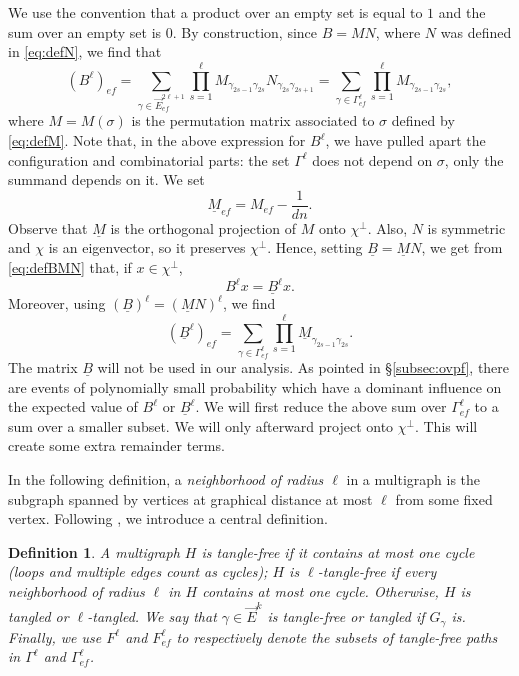 \documentclass[11pt]{article}
\newtheorem{definition}[lemma]{Definition}
\newcommand{\1}{1\!\!{\sf I}}\newcommand{\IND}{\1}
\begin{document}
 We use the convention that a product over an empty set is equal to $1$ and the sum over an empty set is $0$. By construction, since $B = MN$, where $N$ was defined in \eqref{eq:defN}, we find that
$$
(B^{\ell}) _{e f} =  \sum_{\gamma \in \vec E^{2\ell+1} _{e f}} \prod_{s=1}^{\ell} M_{\gamma_{2s-1} \gamma_{2s}} N_{\gamma_{2s} \gamma_{2s +1} } = \sum_{\gamma \in \Gamma^{\ell} _{e f}} \prod_{s=1}^{\ell} M_{\gamma_{2s-1} \gamma_{2s}},
$$
where $M =M(\sigma)$ is the permutation matrix associated to $\sigma$  defined by \eqref{eq:defM}.  Note that, in the above expression for $B^\ell$, we have pulled apart the configuration and combinatorial parts: the set $\Gamma^{\ell}$ does not depend on $\sigma$, only the summand depends on it.  We set 
\begin{equation}\label{eq:defW}
\underline M_{ef } = M_{ef}- \frac 1 {dn}.
\end{equation}
Observe that $\underline M$ is the orthogonal projection of $M$ onto $\chi^\perp$. Also, $N$ is symmetric and $\chi$ is an eigenvector, so it preserves $\chi^\perp$. Hence, setting  $\underline B = \underline M N$, we get from \eqref{eq:defBMN} that, if $x \in \chi^\perp$, 
\begin{equation}\label{eq:BBBk}
B^\ell x = \underline B^\ell x. 
\end{equation}
Moreover, using $(\underline B )^\ell = (\underline M N)^\ell$, we find
\begin{equation}\label{eq:defdefub}
(\underline B^{\ell}) _{e f} = \sum_{\gamma \in \Gamma^{\ell} _{e f}} \prod_{s=1}^{\ell} \underline M_{\gamma_{2s-1} \gamma_{2s}}.
\end{equation}
The matrix $\underline B$ will not be used in our analysis. As pointed in \S \ref{subsec:ovpf},  there are events of polynomially small probability which have a dominant influence on the expected value of $B^\ell$ or $\underline B^\ell$. We will first reduce  the above sum over $\Gamma^{\ell} _{e f}$ to a sum over a smaller subset. We will only afterward project onto $\chi^\perp$. This will create some extra remainder terms. 


In the following definition, a {\em neighborhood
of radius $\ell$} in a multigraph is the subgraph spanned  by vertices at graphical distance at most $\ell$ from
some fixed vertex. Following \cite{MR2437174,BL,MNS,BLM}, we introduce a central definition. 
\begin{definition}\label{def2}
A multigraph $H$ is {\em tangle-free} if it contains at most one cycle  (loops and multiple edges count as cycles); $H$ is {\em $\ell$-tangle-free} if every neighborhood of radius $\ell$ in $H$ contains at most one cycle. Otherwise, $H$ is tangled or $\ell$-tangled. We say that $\gamma \in \vec E^k$ is tangle-free or tangled if $G_\gamma$ is. Finally,  we use $F^{\ell}$ and $F^{\ell} _{e f}$ to respectively  denote the subsets of tangle-free paths in $\Gamma^{\ell}$ and $\Gamma^{\ell}_{ef}$.
\end{definition}
\end{document}
